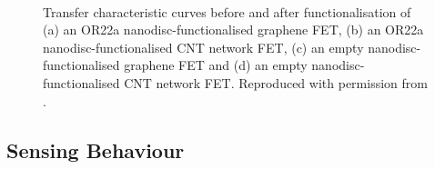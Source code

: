 \documentclass[
  a4paper,
]{scrbook}
\begin{document}
\begin{figure}
\begin{minipage}[t]{0.01\linewidth}
{\centering 

~

}

\end{minipage}%

\caption{\label{fig-functionalisation-literature}Transfer characteristic
curves before and after functionalisation of (a) an OR22a
nanodisc-functionalised graphene FET, (b) an OR22a
nanodisc-functionalised CNT network FET, (c) an empty
nanodisc-functionalised graphene FET and (d) an empty
nanodisc-functionalised CNT network FET. Reproduced with permission from
\autocite{Murugathas2019a,Murugathas2020}.}

\end{figure}

\hypertarget{sensing-behaviour}{%
\subsection{Sensing Behaviour}\label{sensing-behaviour}}
\end{document}
